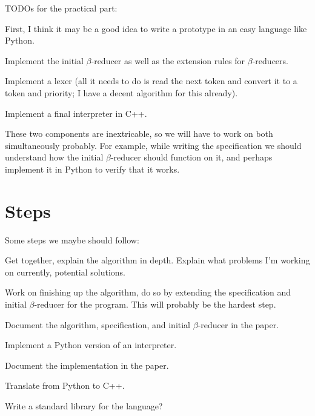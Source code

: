 TODOs for the practical part:
\benum
    \item First, I think it may be a good idea to write a prototype in an easy language like Python.
    \item Implement the initial $\beta$-reducer as well as the extension rules for $\beta$-reducers.
    \item Implement a lexer (all it needs to do is read the next token and convert it to a token and priority; I have a decent algorithm for this already).
    \item Implement a final interpreter in C++.
\eenum

These two components are inextricable, so we will have to work on both simultaneously probably.
For example, while writing the specification we should understand how the initial $\beta$-reducer should function on it, and perhaps implement it in Python to verify that it
works.

\section{Steps}

Some steps we maybe should follow:
\benum
    \item Get together, explain the algorithm in depth.
    Explain what problems I'm working on currently, potential solutions.
    \item Work on finishing up the algorithm, do so by extending the specification and initial $\beta$-reducer for the program.
    This will probably be the hardest step.
    \item Document the algorithm, specification, and initial $\beta$-reducer in the paper.
    \item Implement a Python version of an interpreter.
    \item Document the implementation in the paper.
    \item Translate from Python to C++.
    \item Write a standard library for the language?
\eenum

\bye

